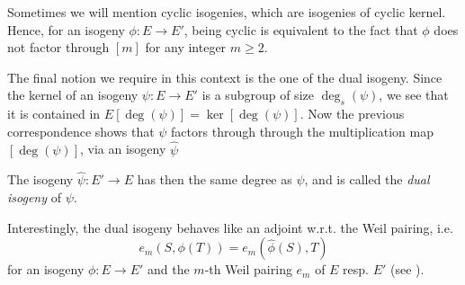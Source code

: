 Sometimes we will mention cyclic isogenies, which are isogenies of cyclic kernel.
Hence, for an isogeny $\phi: E \to E'$, being cyclic is equivalent to the fact that $\phi$ does not factor through $[m]$ for any integer $m \geq 2$.

The final notion we require in this context is the one of the dual isogeny.
Since the kernel of an isogeny $\psi: E \to E'$ is a subgroup of size $\deg_s(\psi)$, we see that it is contained in $E[\deg(\psi)] = \ker[\deg(\psi)]$.
Now the previous correspondence shows that $\psi$ factors through through the multiplication map $[\deg(\psi)]$, via an isogeny $\hat{\psi}$
\begin{center}
\end{center}
The isogeny $\hat{\psi}: E' \to E$ has then the same degree as $\psi$, and is called the \emph{dual isogeny} of $\psi$.

Interestingly, the dual isogeny behaves like an adjoint w.r.t. the Weil pairing, i.e.
\begin{equation*}
    e_m(S, \phi(T)) = e_m(\hat{\phi}(S), T)
\end{equation*}
for an isogeny $\phi: E \to E'$ and the $m$-th Weil pairing $e_m$ of $E$ resp. $E'$ (see \cite[Prop.~III.8.2]{arithmetic_elliptic_curves}).

